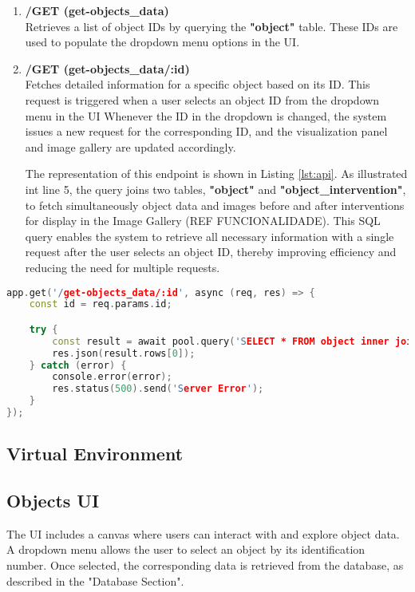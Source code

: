 \begin{enumerate}
  \item \textbf{/GET (get-objects\_data)}
  \\Retrieves a list of object IDs by querying the \textbf{"object"} table. These IDs are used to populate the dropdown menu options in the \gls{UI}.

  \item \textbf{/GET (get-objects\_data/:id)}
  \\Fetches detailed information for a specific object based on its ID. This request is triggered when a user selects an object ID from the dropdown menu in the \gls{UI}
  Whenever the ID in the dropdown is changed, the system issues a new request for the corresponding ID, and the visualization panel and image gallery are updated accordingly.

  The representation of this endpoint is shown in Listing \ref{lst:api}. As illustrated int line 5, the query joins two tables, \textbf{"object"} and \textbf{"object\_intervention"}, to fetch simultaneously object data and images before and after interventions for display in the Image Gallery (REF FUNCIONALIDADE). 
  This SQL query enables the system to retrieve all necessary information with a single request after the user selects an object ID, thereby improving efficiency and reducing the need for multiple requests.

\end{enumerate}

\begin{lstlisting}[language=C++, caption={Example of defining an API endpoint in Node.js.},label={lst:api}]
  app.get('/get-objects_data/:id', async (req, res) => {
    const id = req.params.id;

    try {
        const result = await pool.query('SELECT * FROM object inner join object_intervention on object.id = object_intervention.object_id WHERE object.id = $1', [id]);
        res.json(result.rows[0]);
    } catch (error) {
        console.error(error);
        res.status(500).send('Server Error');
    }
});
\end{lstlisting}


\subsection{Virtual Environment}

\subsection*{Objects UI}
The UI includes a canvas where users can interact with and explore object data. A dropdown menu allows the user to select an object by its identification number. Once selected, the corresponding data is retrieved from the database, as described in the "Database Section".

